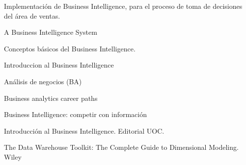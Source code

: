 \documentclass[twoside,twocolumn]{article}
\begin{document}
\begin{thebibliography}{99} 

\newblock Implementación de Business Intelligence, para el proceso de toma de decisiones del área de ventas.

\newblock A Business Intelligence System

Conceptos básicos del Business Intelligence.

\newblock Introduccion al Business Intelligence

\newblock Análisis de negocios (BA)

\newblock Business analytics career paths

\newblock Business Intelligence: competir con información


\bibitem[Curto J., 2010]{} 
\newblock Introducción al Business Intelligence. Editorial UOC.

\newblock  The Data Warehouse Toolkit: The Complete Guide to Dimensional Modeling. Wiley
 
\end{thebibliography}


\end{document}
